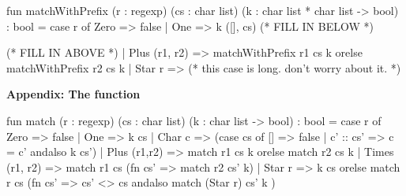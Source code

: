 \documentclass[addpoints,12pt]{exam}
\begin{document}
\begin{questions}
\begin{parts}
  \begin{codeblock}
    fun matchWithPrefix
          (r : regexp)
          (cs : char list)
          (k : char list * char list -> bool) : bool =
      case r of
        Zero => false
      | One => k ([], cs)
    (* FILL IN BELOW *)
  \end{codeblock}
  \begin{codeblock}
    (* FILL IN ABOVE *)
      | Plus (r1, r2) =>
          matchWithPrefix r1 cs k orelse matchWithPrefix r2 cs k
      | Star r =>
          (* this case is long. don't worry about it. *)
  \end{codeblock}
\end{parts}

\newpage

\textbf{Appendix: The  function}

\vspace{10pt}

\begin{codeblock}
  fun match (r : regexp)
            (cs : char list)
            (k : char list -> bool) : bool =
    case r of
      Zero => false
    | One => k cs
    | Char c => (case cs of
        [] => false
      | c' :: cs' => c = c' andalso k cs')
    | Plus (r1,r2) => match r1 cs k orelse match r2 cs k
    | Times (r1, r2) => match r1 cs (fn cs' => match r2 cs' k)
    | Star r =>
        k cs orelse
        match r cs (fn cs' =>
          cs' <> cs andalso match (Star r) cs' k
        )
\end{codeblock}

\end{questions}
\end{document}
